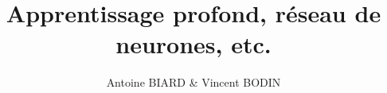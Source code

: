 \documentclass[handout]{beamer}
\title{Apprentissage profond, réseau de neurones, etc.}
\author{Antoine BIARD \& Vincent BODIN}
\begin{document}
\renewcommand{\contentsname}{Sommaire}


\begin{frame}[allowframebreaks]
\titlepage
\end{frame}





\end{document}
